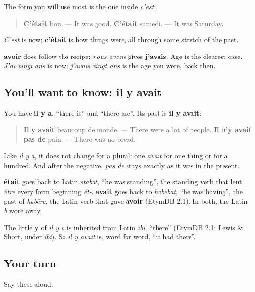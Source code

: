 The form you will use most is the one inside \emph{c'est}:

\begin{quote}
\textbf{C'était} bon. — It was good. \textbf{C'était} samedi. — It was Saturday.
\end{quote}

\emph{C'est} is now; \textbf{c'était} is how things were, all through some stretch of the past.

\textbf{avoir} does follow the recipe: \emph{nous avons} gives \textbf{j'avais}. Age is the clearest case. \emph{J'ai vingt ans} is now; \emph{j'avais vingt ans} is the age you were, back then.

\subsection*{You'll want to know: il y avait}
You have \textbf{il y a}, \textquotedblleft{}there is\textquotedblright{} and \textquotedblleft{}there are\textquotedblright{}. Its past is \textbf{il y avait}:

\begin{quote}
\textbf{Il y avait} beaucoup de monde. — There were a lot of people. \textbf{Il n'y avait pas de} pain. — There was no bread.
\end{quote}

Like \emph{il y a}, it does not change for a plural: one \emph{avait} for one thing or for a hundred. And after the negative, \emph{pas de} stays exactly as it was in the present.

\begin{cousinweb}
\textbf{était} goes back to Latin \emph{stābat}, \textquotedblleft{}he was standing\textquotedblright{}, the standing verb that lent \emph{être} every form beginning \emph{ét-}. \textbf{avait} goes back to \emph{habēbat}, \textquotedblleft{}he was having\textquotedblright{}, the past of \emph{habēre}, the Latin verb that gave \textbf{avoir} (EtymDB 2.1). In both, the Latin \emph{b} wore away.

The little \textbf{y} of \emph{il y a} is inherited from Latin \emph{ibī}, \textquotedblleft{}there\textquotedblright{} (EtymDB 2.1; Lewis \& Short, under \emph{ibi}). So \emph{il y avait} is, word for word, \textquotedblleft{}it had there\textquotedblright{}.
\end{cousinweb}

\subsection*{Your turn}
Say these aloud:

